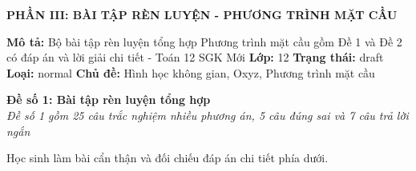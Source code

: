 \documentclass[12pt,a4paper]{article}
\newcommand{\doctitle}[1]{\begin{center}\Large\textbf{#1}\end{center}}
\newcommand{\docdesc}[1]{\textbf{Mô tả:} #1}
\newcommand{\docgrade}[1]{\textbf{Lớp:} #1}
\newcommand{\docstatus}[1]{\textbf{Trạng thái:} #1}
\newcommand{\doctype}[1]{\textbf{Loại:} #1}
\newcommand{\doctopics}[1]{\textbf{Chủ đề:} #1}
\newenvironment{lesson}[2]{
	\noindent\textbf{\Large #1}\\
	\textit{#2}
}{}
\begin{document}
\doctitle{PHẦN III: BÀI TẬP RÈN LUYỆN - PHƯƠNG TRÌNH MẶT CẦU}
\docdesc{Bộ bài tập rèn luyện tổng hợp Phương trình mặt cầu gồm Đề 1 và Đề 2 có đáp án và lời giải chi tiết - Toán 12 SGK Mới}
\docgrade{12}
\docstatus{draft}
\doctype{normal}
\doctopics{Hình học không gian, Oxyz, Phương trình mặt cầu}


\begin{lesson}{Đề số 1: Bài tập rèn luyện tổng hợp}{Đề số 1 gồm 25 câu trắc nghiệm nhiều phương án, 5 câu đúng sai và 7 câu trả lời ngắn}

Học sinh làm bài cẩn thận và đối chiếu đáp án chi tiết phía dưới.

\end{lesson}
\end{document}
